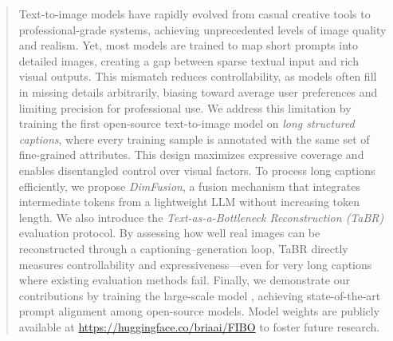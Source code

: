 \begin{abstract}

Text-to-image models have rapidly evolved from casual creative tools to professional-grade systems, achieving unprecedented levels of image quality and realism. Yet, most models are trained to map short prompts into detailed images, creating a gap between sparse textual input and rich visual outputs. This mismatch reduces controllability, as models often fill in missing details arbitrarily, biasing toward average user preferences and limiting precision for professional use. We address this limitation by training the first open-source text-to-image model on \emph{long structured captions}, where every training sample is annotated with the same set of fine-grained attributes. This design maximizes expressive coverage and enables disentangled control over visual factors. To process long captions efficiently, we propose \emph{DimFusion}, a fusion mechanism that integrates intermediate tokens from a lightweight LLM without increasing token length. We also introduce the \emph{Text-as-a-Bottleneck Reconstruction (TaBR)} evaluation protocol. By assessing how well real images can be reconstructed through a captioning–generation loop, TaBR directly measures controllability and expressiveness—even for very long captions where existing evaluation methods fail. 
Finally, we demonstrate our contributions by training the large-scale model \emph{\modelname{}}, achieving state-of-the-art prompt alignment among open-source models. Model weights are publicly available at \url{https://huggingface.co/briaai/FIBO}
 to foster future research.
\end{abstract}

